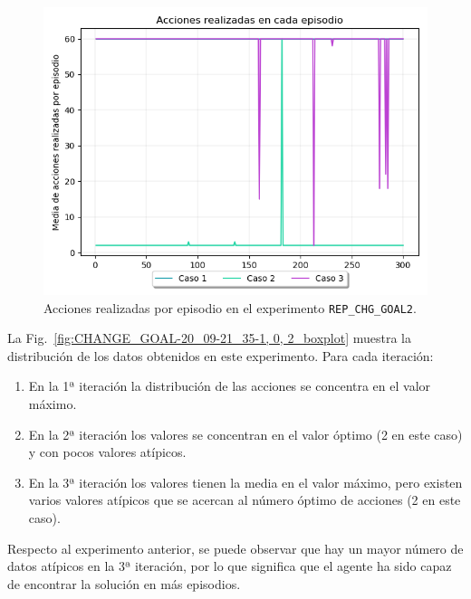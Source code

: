\begin{figure}
    \centering
    \includegraphics[scale=0.4]{cap5_experimentacion/images/CHANGE_GOAL-20_09-21_35-1, 0, 2_acciones.png}
    \caption{Acciones realizadas por episodio en el experimento \texttt{REP\_CHG\_GOAL2}.}
    \label{fig:CHANGE_GOAL-20_09-21_35-1, 0, 2_acciones}
\end{figure}

La Fig.~\ref{fig:CHANGE_GOAL-20_09-21_35-1, 0, 2_boxplot} muestra la distribución de los datos obtenidos en este experimento. Para cada iteración:
\begin{enumerate}
    \item En la 1ª iteración la distribución de las acciones se concentra en el valor máximo.
    \item En la 2ª iteración los valores se concentran en el valor óptimo (2 en este caso) y con pocos valores atípicos.
    \item En la 3ª iteración los valores tienen la media en el valor máximo, pero existen varios valores atípicos que se acercan al número óptimo de acciones (2 en este caso).
\end{enumerate}

Respecto al experimento anterior, se puede observar que hay un mayor número de datos atípicos en la 3ª iteración, por lo que significa que el agente ha sido capaz de encontrar la solución en más episodios. \\
 
